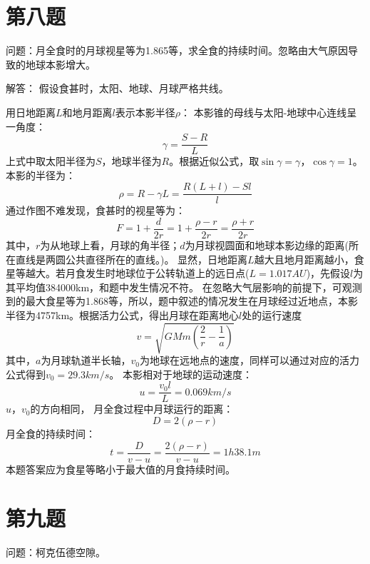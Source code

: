 \documentclass[a4paper,12pt]{report}
\begin{document}
\section{第八题}
\noindent 问题：月全食时的月球视星等为1.865等，求全食的持续时间。忽略由大气原因导致的地球本影增大。

\noindent 解答：
假设食甚时，太阳、地球、月球严格共线。

\noindent 用日地距离$L$和地月距离$l$表示本影半径$\rho$：
本影锥的母线与太阳-地球中心连线呈一角度：
\begin{equation}
	\gamma = \frac{S-R}{L}
\end{equation}
上式中取太阳半径为$S$，地球半径为$R$。根据近似公式，取$\sin \gamma=\gamma $，$\cos \gamma =1$。
本影的半径为：
\begin{equation}
	\rho=R-\gamma L=\frac{R(L+l)-Sl}{l}
\end{equation}
通过作图不难发现，食甚时的视星等为：
\begin{equation}
	F=1+\frac{d}{2r}=1+\frac{\rho-r}{2r}=\frac{\rho+r}{2r}
\end{equation}
其中，$r$为从地球上看，月球的角半径；$d$为月球视圆面和地球本影边缘的距离(所在直线是两圆公共直径所在的直线。)。
显然，日地距离$L$越大且地月距离越小，食星等越大。若月食发生时地球位于公转轨道上的远日点($L=1.017AU$)，先假设$l$为其平均值384000km，和题中发生情况不符。
在忽略大气层影响的前提下，可观测到的最大食星等为1.868等，所以，题中叙述的情况发生在月球经过近地点，本影半径为4757km。根据活力公式，得出月球在距离地心$l$处的运行速度
\begin{equation}
	v=\sqrt{GMm(\frac{2}{r}-\frac{1}{a})}
\end{equation}
其中，$a$为月球轨道半长轴，$v_{0}$为地球在远地点的速度，同样可以通过对应的活力公式得到$v_{0}=29.3km/s$。
本影相对于地球的运动速度：
\begin{equation}
	u=\frac{v_{0}l}{L}=0.069km/s
\end{equation}
$u$，$v_{0}$的方向相同，
月全食过程中月球运行的距离：
\begin{equation}
	D=2(\rho-r)
\end{equation}
月全食的持续时间：
\begin{equation}
	t=\frac{D}{v-u}=\frac{2(\rho -r)}{v-u}=1h38.1m
\end{equation}
本题答案应为食星等略小于最大值的月食持续时间。

\section{第九题}
\noindent 问题：柯克伍德空隙。
\end{document}
